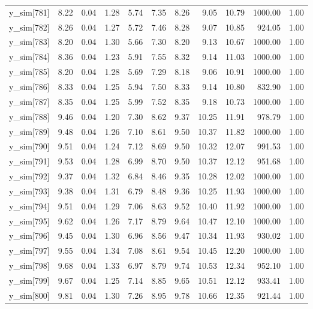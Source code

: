 \begin{table}[ht]
\begin{tabular}{rrrrrrrrrrr}
  y\_sim[781] & 8.22 & 0.04 & 1.28 & 5.74 & 7.35 & 8.26 & 9.05 & 10.79 & 1000.00 & 1.00 \\ 
  y\_sim[782] & 8.26 & 0.04 & 1.27 & 5.72 & 7.46 & 8.28 & 9.07 & 10.85 & 924.05 & 1.00 \\ 
  y\_sim[783] & 8.20 & 0.04 & 1.30 & 5.66 & 7.30 & 8.20 & 9.13 & 10.67 & 1000.00 & 1.00 \\ 
  y\_sim[784] & 8.36 & 0.04 & 1.23 & 5.91 & 7.55 & 8.32 & 9.14 & 11.03 & 1000.00 & 1.00 \\ 
  y\_sim[785] & 8.20 & 0.04 & 1.28 & 5.69 & 7.29 & 8.18 & 9.06 & 10.91 & 1000.00 & 1.00 \\ 
  y\_sim[786] & 8.33 & 0.04 & 1.25 & 5.94 & 7.50 & 8.33 & 9.14 & 10.80 & 832.90 & 1.00 \\ 
  y\_sim[787] & 8.35 & 0.04 & 1.25 & 5.99 & 7.52 & 8.35 & 9.18 & 10.73 & 1000.00 & 1.00 \\ 
  y\_sim[788] & 9.46 & 0.04 & 1.20 & 7.30 & 8.62 & 9.37 & 10.25 & 11.91 & 978.79 & 1.00 \\ 
  y\_sim[789] & 9.48 & 0.04 & 1.26 & 7.10 & 8.61 & 9.50 & 10.37 & 11.82 & 1000.00 & 1.00 \\ 
  y\_sim[790] & 9.51 & 0.04 & 1.24 & 7.12 & 8.69 & 9.50 & 10.32 & 12.07 & 991.53 & 1.00 \\ 
  y\_sim[791] & 9.53 & 0.04 & 1.28 & 6.99 & 8.70 & 9.50 & 10.37 & 12.12 & 951.68 & 1.00 \\ 
  y\_sim[792] & 9.37 & 0.04 & 1.32 & 6.84 & 8.46 & 9.35 & 10.28 & 12.02 & 1000.00 & 1.00 \\ 
  y\_sim[793] & 9.38 & 0.04 & 1.31 & 6.79 & 8.48 & 9.36 & 10.25 & 11.93 & 1000.00 & 1.00 \\ 
  y\_sim[794] & 9.51 & 0.04 & 1.29 & 7.06 & 8.63 & 9.52 & 10.40 & 11.92 & 1000.00 & 1.00 \\ 
  y\_sim[795] & 9.62 & 0.04 & 1.26 & 7.17 & 8.79 & 9.64 & 10.47 & 12.10 & 1000.00 & 1.00 \\ 
  y\_sim[796] & 9.45 & 0.04 & 1.30 & 6.96 & 8.56 & 9.47 & 10.34 & 11.93 & 930.02 & 1.00 \\ 
  y\_sim[797] & 9.55 & 0.04 & 1.34 & 7.08 & 8.61 & 9.54 & 10.45 & 12.20 & 1000.00 & 1.00 \\ 
  y\_sim[798] & 9.68 & 0.04 & 1.33 & 6.97 & 8.79 & 9.74 & 10.53 & 12.34 & 952.10 & 1.00 \\ 
  y\_sim[799] & 9.67 & 0.04 & 1.25 & 7.14 & 8.85 & 9.65 & 10.51 & 12.12 & 933.41 & 1.00 \\ 
  y\_sim[800] & 9.81 & 0.04 & 1.30 & 7.26 & 8.95 & 9.78 & 10.66 & 12.35 & 921.44 & 1.00 \\ 

\end{tabular}
\end{table}
